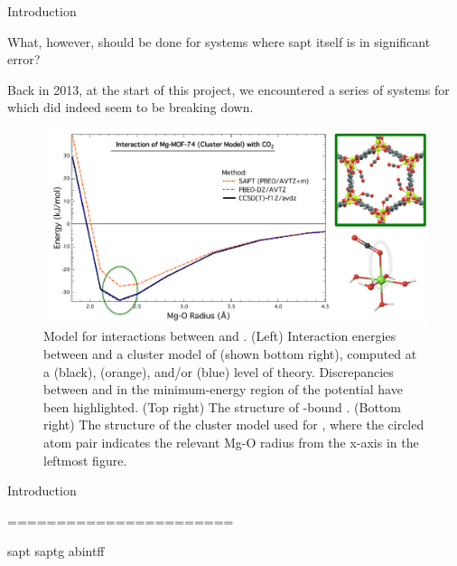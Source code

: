 \begin{section}{Introduction}


What, however, should be done for systems where \acrshort{sapt} itself
is in significant error?\cite{Parker2014a} 

Back in 2013, at the start of this project, we encountered a series of systems
for which \sapt did indeed seem to be breaking down.


    \begin{figure}
    \centering
    \includegraphics[width=1.0\textwidth]{lmoeda/sapt_breakdown.pdf}
    \caption{
Model \pes for interactions between \co and \mgmof.  (Left) Interaction
energies between \co and a cluster model of \mgmof (shown bottom right),
computed at a \ccsdtf (black), \sapt (orange), and/or \pbeod (blue) level of
theory. Discrepancies
between \sapt and \ccsdtf in the minimum-energy region of the potential have
been highlighted. (Top right)
The structure of \co-bound \mgmof. (Bottom right) The structure of the cluster
model used for \mgmof, where the circled atom pair indicates the relevant Mg-O
radius from the x-axis in the leftmost figure.
            }
    \label{fig:rmse}
    \end{figure}

\end{section}{Introduction}


=======================

\gls{sapt}
\gls{saptg}
\gls{abintff}


